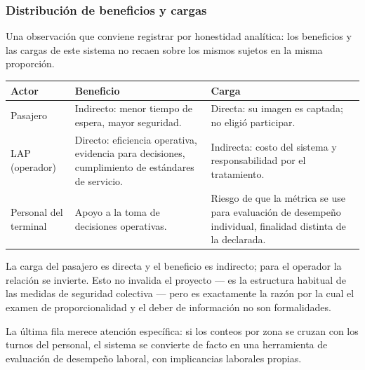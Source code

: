 \subsubsection{Distribución de beneficios y cargas}

Una observación que conviene registrar por honestidad analítica: los
beneficios y las cargas de este sistema no recaen sobre los mismos
sujetos en la misma proporción.

\begin{center}
\small
\begin{tabularx}{\linewidth}{@{}L{3.2cm}YY@{}}
\toprule
\textbf{Actor} & \textbf{Beneficio} & \textbf{Carga} \\
\midrule
Pasajero &
Indirecto: menor tiempo de espera, mayor seguridad. &
Directa: su imagen es captada; no eligió participar. \\
\addlinespace
LAP (operador) &
Directo: eficiencia operativa, evidencia para decisiones, cumplimiento
de estándares de servicio. &
Indirecta: costo del sistema y responsabilidad por el tratamiento. \\
\addlinespace
Personal del terminal &
Apoyo a la toma de decisiones operativas. &
Riesgo de que la métrica se use para evaluación de desempeño individual,
finalidad distinta de la declarada. \\
\bottomrule
\end{tabularx}
\end{center}

La carga del pasajero es directa y el beneficio es indirecto; para el
operador la relación se invierte. Esto no invalida el proyecto --- es
la estructura habitual de las medidas de seguridad colectiva --- pero es
exactamente la razón por la cual el examen de proporcionalidad y el deber
de información no son formalidades.

La última fila merece atención específica: si los conteos por zona se
cruzan con los turnos del personal, el sistema se convierte de facto en
una herramienta de evaluación de desempeño laboral, con implicancias
laborales propias.


